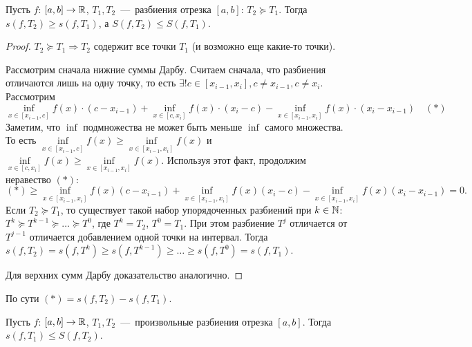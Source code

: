 \begin{lemma}
    \hypertarget{lemma12.2}{Пусть $f$: $[a, b] \rightarrow \mathbb{R}$, $T_1 , T_2$~---~разбиения отрезка $[a, b]$: $T_2 \succcurlyeq T_1$. Тогда $s(f, T_2) \geq s(f, T_1)$, а $S(f, T_2) \leq S(f, T_1)$.}
\end{lemma}
\begin{proof}
    $T_2 \succcurlyeq T_1 \Rightarrow T_2$ содержит все точки $T_1$ (и возможно еще какие-то точки).

    \noindent Рассмотрим сначала нижние суммы Дарбу. Считаем сначала, что разбиения отличаются лишь на одну точку, то есть $\exists! c \in [x_{i - 1}, x_i], c \neq x_{i - 1}, c \neq x_{i}$. Рассмотрим
    $$
    \inf \limits_{x \in [x_{i - 1}, c]} f(x)\cdot (c - x_{i - 1}) + \inf \limits_{x \in [c, x_i]}f(x)\cdot (x_i - c) - \inf \limits_{x \in [x_{i - 1}, x_i]} f(x) \cdot (x_i - x_{i - 1}) \quad (*)
    $$
    Заметим, что $\inf$ подмножества не может быть меньше $\inf$ самого множества. То есть $\inf \limits_{x \in [x_{i - 1}, c]} f(x) \geq \inf \limits_{x \in [x_{i - 1}, x_i]} f(x)$  и $\inf \limits_{x \in [c, x_i]} f(x) \geq \inf \limits_{x \in [x_{i - 1}, x_i]} f(x)$. Используя этот факт, продолжим неравество $(*)$: 
    $$
    (*) \geq \inf \limits_{x \in [x_{i - 1}, x_i]} f(x) (c - x_{i - 1}) + \inf \limits_{x \in [x_{i - 1}, x_i]} f(x) (x_{i} - c) - \inf \limits_{x \in [x_{i - 1}, x_i]} f(x) (x_i - x_{i - 1}) = 0.
    $$
    Если $T_2 \succcurlyeq T_1$, то существует такой набор упорядоченных разбиений при $k \in \mathbb{N}$: $T^k \succcurlyeq T^{k - 1} \succcurlyeq \ldots \succcurlyeq T^0$, где $T^k = T_2$, $T^0 = T_1$. При этом разбиение $T^j$ отличается от $T^{j - 1}$ отличается добавлением одной точки на интервал. Тогда $s (f, T_2) = s(f, T^k) \geq s(f, T^{k - 1}) \geq \ldots \geq s(f, T^0) = s(f, T_1)$.

    \noindent Для верхних сумм Дарбу доказательство аналогично. 
\end{proof}

\begin{note}
    По сути $(*) = s(f, T_2) - s(f, T_1)$.
\end{note}

\begin{corollary}
    Пусть $f$: $[a, b] \rightarrow \mathbb{R}$, $T_1, T_2$~---~произвольные разбиения отрезка $[a, b]$. Тогда $s(f, T_1) \leq S(f, T_2)$.
\end{corollary}

